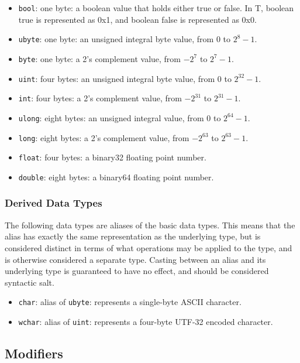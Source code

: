 \documentclass[letterpaper,12pt]{book}
\begin{document}
\begin{itemize}
	\item \texttt{bool}: one byte: a boolean value that holds either true or false. In T, boolean true is represented as 0x1, and boolean false is represented as 0x0.
	\item \texttt{ubyte}: one byte: an unsigned integral byte value, from 0 to \(2^8 - 1\).
	\item \texttt{byte}: one byte: a 2's complement value, from \(-2^7\) to \(2^7 - 1\).
	\item \texttt{uint}: four bytes: an unsigned integral byte value, from 0 to \(2^{32} - 1\).
	\item \texttt{int}: four bytes: a 2's complement value, from \(-2^{31}\) to \(2^{31} - 1\).
	\item \texttt{ulong}: eight bytes: an unsigned integral value, from 0 to \(2^{64} - 1\).
	\item \texttt{long}: eight bytes: a 2's complement value, from \(-2^{63}\) to \(2^{63} - 1\).
	\item \texttt{float}: four bytes: a binary32 floating point number.
	\item \texttt{double}: eight bytes: a binary64 floating point number.
\end{itemize}

\subsubsection{Derived Data Types}

The following data types are aliases of the basic data types. This means that the alias has exactly the same representation as the underlying type, but is considered distinct in terms of what operations may be applied to the type, and is otherwise considered a separate type. Casting between an alias and its underlying type is guaranteed to have no effect, and should be considered syntactic salt.

\begin{itemize}
	\item \texttt{char}: alias of \texttt{ubyte}: represents a single-byte ASCII character.
	\item \texttt{wchar}: alias of \texttt{uint}: represents a four-byte UTF-32 encoded character.
\end{itemize}

\subsection{Modifiers}
\end{document}

